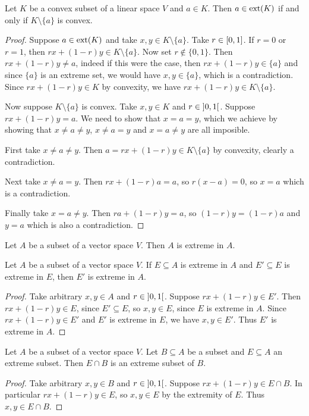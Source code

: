 \begin{lemma} \label{extremePointCosetConvex}
Let $K$ be a convex subset of a linear space $V$ and $a\in K$. Then $a\in \operatorname{ext}(K)$ \textup{if and only if} $K\setminus\{a\}$ is convex.
\end{lemma}
\begin{proof}
Suppose $a\in\operatorname{ext}(K)$ and take $x,y\in K\setminus\{a\}$. Take $r\in \interval{0,1}$. If $r=0$ or $r=1$, then $rx+(1-r)y\in K\setminus\{a\}$. Now set $r\notin\{0,1\}$. Then $rx+(1-r)y \neq a$, indeed if this were the case, then $rx+(1-r)y \in \{a\}$ and since $\{a\}$ is an extreme set, we would have $x,y\in \{a\}$, which is a contradiction. Since $rx+(1-r)y\in K$ by convexity, we have $rx+(1-r)y\in K\setminus\{a\}$.

Now suppose $K\setminus\{a\}$ is convex. Take $x,y\in K$ and $r\in \interval[o]{0,1}$. Suppose $rx+(1-r)y = a$. We need to show that $x=a=y$, which we achieve by showing that $x\neq a \neq y$, $x\neq a=y$ and $x=a\neq y$ are all imposible.

First take $x\neq a \neq y$. Then $a = rx+(1-r)y \in K\setminus \{a\}$ by convexity, clearly a contradiction.

Next take $x\neq a=y$. Then $rx+(1-r)a = a$, so $r(x-a) = 0$, so $x=a$ which is a contradiction.

Finally take $x=a \neq y$. Then $ra+(1-r)y = a$, so $(1-r)y = (1-r)a$ and $y=a$ which is also a contradiction.
\end{proof}

\begin{lemma} \label{setExtremeInItself}
Let $A$ be a subset of a vector space $V$. Then $A$ is extreme in $A$.
\end{lemma}

\begin{lemma} \label{extremeSetOfExtremeSetIsExtreme}
Let $A$ be a subset of a vector space $V$. If $E\subseteq A$ is extreme in $A$ and $E'\subseteq E$ is extreme in $E$, then $E'$ is extreme in $A$.
\end{lemma}
\begin{proof}
Take arbitrary $x,y\in A$ and $r\in \interval[o]{0,1}$. Suppose $rx+(1-r)y\in E'$. Then $rx+(1-r)y\in E$, since $E'\subseteq E$, so $x,y\in E$, since $E$ is extreme in $A$. Since $rx+(1-r)y\in E'$ and $E'$ is extreme in $E$, we have $x,y\in E'$. Thus $E'$ is extreme in $A$.
\end{proof}

\begin{lemma} \label{extremeSetOfSubset}
Let $A$ be a subset of a vector space $V$. Let $B\subseteq A$ be a subset and $E\subseteq A$ an extreme subset. Then $E\cap B$ is an extreme subset of $B$.
\end{lemma}
\begin{proof}
Take arbitrary $x,y\in B$ and $r\in \interval[o]{0,1}$. Suppose $rx+(1-r)y\in E\cap B$. In particular $rx+(1-r)y\in E$, so $x,y\in E$ by the extremity of $E$. Thus $x,y\in E\cap B$.
\end{proof}

